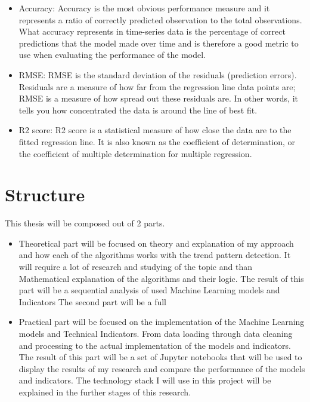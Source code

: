 \documentclass{imc-inf}
\begin{document}
\begin{enumerate}
\begin{itemize}
\begin{itemize}
				\item Accuracy: Accuracy is the most obvious performance measure and it represents a ratio of correctly predicted observation to the total observations.
				What accuracy represents in time-series data is the percentage of correct predictions that the model made over time and is therefore a good metric to use when evaluating the performance of the model.
				\item RMSE: RMSE is the standard deviation of the residuals (prediction errors).
				Residuals are a measure of how far from the regression line data points are;
				RMSE is a measure of how spread out these residuals are. In other words, it tells you how concentrated the data is around the line of best fit.
				\item R2 score: R2 score is a statistical measure of how close the data are to the fitted regression line. It is also known as the coefficient of determination,
				or the coefficient of multiple determination for multiple regression.
			\end{itemize}
			
			
		\end{itemize}
	\end{enumerate}
	
	\section{Structure}
	This thesis will be composed out of 2 parts.
	
	\begin{itemize}
		\item Theoretical part will be focused on
		theory and explanation of my approach and how each of the algorithms works with
		the trend pattern detection. It will require a lot of research and studying of the topic and than Mathematical
		explanation of the algorithms and their logic. The result of this part will be a sequential analysis of used Machine Learning models and Indicators
		The second part will be a full
		\item Practical part will be focused on the implementation of the Machine Learning models and Technical Indicators.
		From data loading through data cleaning and processing to the actual implementation of the models and indicators.
		The result of this part will be a set of Jupyter notebooks that will be used to display the results of my research
		and compare the performance of the models and indicators. The technology stack I will use in this project will be
		explained in the further stages of this research. 
	\end{itemize}
	
\end{document}
